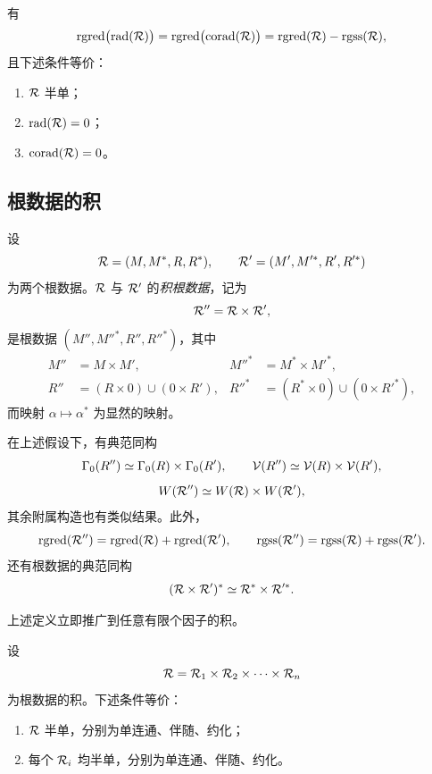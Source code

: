 \begin{lemma}\label{sga3:XXI:6.3.6}
有
\[
 \operatorname{rgred}\bigl(\operatorname{rad}(\mathcal{R})\bigr)
 =
 \operatorname{rgred}\bigl(\operatorname{corad}(\mathcal{R})\bigr)
 =
 \operatorname{rgred}(\mathcal{R})-\operatorname{rgss}(\mathcal{R}),
\]
且下述条件等价：
\begin{enumerate}
\item[(i)] \(\mathcal{R}\) 半单；
\item[(ii)] \(\operatorname{rad}(\mathcal{R})=0\)；
\item[(iii)] \(\operatorname{corad}(\mathcal{R})=0\)。
\end{enumerate}
\end{lemma}

\subsection{根数据的积}\label{sga3:XXI:6.4}

\begin{definition}\label{sga3:XXI:6.4.1}
设
\[
 \mathcal{R}=(M,M^\ast,R,R^\ast),
 \qquad
 \mathcal{R}'=(M',M'^\ast,R',R'^\ast)
\]
为两个根数据。\(\mathcal{R}\) 与 \(\mathcal{R}'\) 的\emph{积根数据}，记为
\[
 \mathcal{R}''=\mathcal{R}\times\mathcal{R}',
\]
是根数据 \((M'',M''^\ast,R'',R''^\ast)\)，其中
\[
\begin{aligned}
 M''&=M\times M',
 &M''^\ast&=M^\ast\times M'^\ast,\\
 R''&=(R\times0)\cup(0\times R'),
 &R''^\ast&=(R^\ast\times0)\cup(0\times R'^\ast),
\end{aligned}
\]
而映射 \(\alpha\mapsto\alpha^\ast\) 为显然的映射。
\end{definition}

\begin{proposition}\label{sga3:XXI:6.4.2}
在上述假设下，有典范同构
\[
 \Gamma_0(R'')\simeq\Gamma_0(R)\times\Gamma_0(R'),
 \qquad
 \mathcal{V}(R'')\simeq\mathcal{V}(R)\times\mathcal{V}(R'),
\]
\[
 W(\mathcal{R}'')\simeq W(\mathcal{R})\times W(\mathcal{R}'),
\]
其余附属构造也有类似结果。此外，
\[
 \operatorname{rgred}(\mathcal{R}'')=\operatorname{rgred}(\mathcal{R})+\operatorname{rgred}(\mathcal{R}'),
 \qquad
 \operatorname{rgss}(\mathcal{R}'')=\operatorname{rgss}(\mathcal{R})+\operatorname{rgss}(\mathcal{R}').
\]
还有根数据的典范同构
\[
 (\mathcal{R}\times\mathcal{R}')^\ast\simeq\mathcal{R}^\ast\times\mathcal{R}'^\ast.
\]
\end{proposition}

上述定义立即推广到任意有限个因子的积。

\begin{proposition}\label{sga3:XXI:6.4.3}
设
\[
 \mathcal{R}=\mathcal{R}_1\times\mathcal{R}_2\times\cdots\times\mathcal{R}_n
\]
为根数据的积。下述条件等价：
\begin{enumerate}
\item[(i)] \(\mathcal{R}\) 半单，分别为单连通、伴随、约化；
\item[(ii)] 每个 \(\mathcal{R}_i\) 均半单，分别为单连通、伴随、约化。
\end{enumerate}
\end{proposition}


